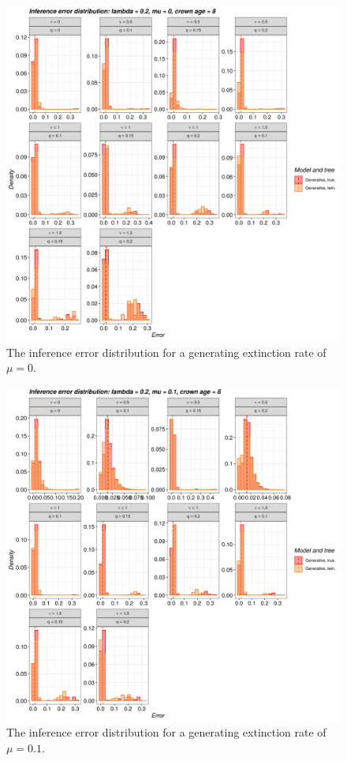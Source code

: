 \begin{figure}[!htbp]
  \includegraphics[width=\textwidth]{20200204_figure_1a.png}
  \caption{
    The inference error distribution for a generating extinction rate of $\mu = 0$.
  }
  \label{fig:errors_yule}
\end{figure}

\begin{figure}[!htbp]
  \includegraphics[width=\textwidth]{20200204_figure_1b.png}
  \caption{
    The inference error distribution for a generating extinction rate of $\mu = 0.1$.
  }
  \label{fig:errors_bd}
\end{figure}

